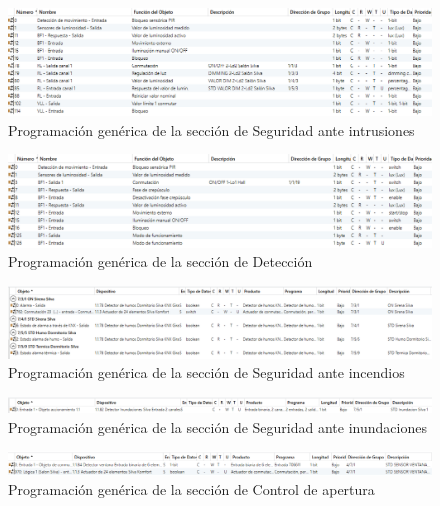 \begin{figure}[H]
\includegraphics[width=1.55\textwidth]{figures/prog_pres.png}   
\caption{Programación genérica de la sección de Seguridad ante intrusiones}
\label{fig:prog_pres}
\end{figure}

\begin{figure}[H]
\includegraphics[width=1.55\textwidth]{figures/prog_mov.png}   
\caption{Programación genérica de la sección de Detección}
\label{fig:prog_mov}
\end{figure}

\begin{figure}[H]
\includegraphics[width=1.55\textwidth]{figures/prog_humo.png}   
\caption{Programación genérica de la sección de Seguridad ante incendios}
\label{fig:prog_humo}
\end{figure}

\begin{figure}[H]
\includegraphics[width=1.55\textwidth]{figures/prog_inun.png}   
\caption{Programación genérica de la sección de Seguridad ante inundaciones}
\label{fig:prog_inun}
\end{figure}

\begin{figure}[H]
\includegraphics[width=1.55\textwidth]{figures/prog_vent.png}   
\caption{Programación genérica de la sección de Control de apertura}
\label{fig:prog_vent}
\end{figure}


